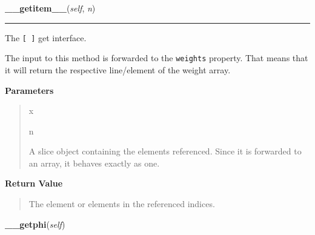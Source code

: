     \begin{boxedminipage}{\textwidth}

    \raggedright \textbf{\_\_getitem\_\_}(\textit{self}, \textit{n})

    \vspace{-1.5ex}

    \rule{\textwidth}{0.5\fboxrule}

The \texttt{{[} {]}} get interface.

The input to this method is forwarded to the \texttt{weights} property. That
means that it will return the respective line/element of the weight
array.
    \vspace{1ex}

      \textbf{Parameters}
      \begin{quote}
        \begin{Ventry}{x}

          \item[n]


A slice object containing the elements referenced. Since it is
forwarded to an array, it behaves exactly as one.
        \end{Ventry}

      \end{quote}

    \vspace{1ex}

      \textbf{Return Value}
      \begin{quote}

The element or elements in the referenced indices.
      \end{quote}

    \vspace{1ex}

    \end{boxedminipage}

    \label{peach:nn:base:Layer:__getphi}

    \vspace{0.5ex}

    \begin{boxedminipage}{\textwidth}

    \raggedright \textbf{\_\_getphi}(\textit{self})

    \end{boxedminipage}

